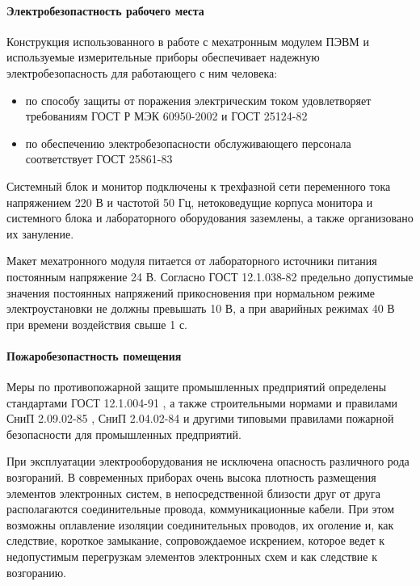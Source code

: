 \paragraph{Электробезопастность рабочего места}

Конструкция использованного в работе с мехатронным модулем ПЭВМ и используемые
измерительные приборы обеспечивает надежную электробезопасность для работающего
с ним человека:

\begin{itemize}
    \item   по способу защиты от поражения электрическим током удовлетворяет
            требованиям ГОСТ Р МЭК 60950-2002 \cite{ecology_gost_60950_2002}
            и ГОСТ 25124-82 \cite{ecology_gost_25124_82}

    \item   по обеспечению электробезопасности обслуживающего персонала
            соответствует ГОСТ 25861-83 \cite{ecology_gost_25861_83}
\end{itemize}

Системный блок и монитор подключены к трехфазной сети переменного тока напряжением
220 В и частотой 50 Гц, нетоковедущие корпуса монитора и системного блока и лабораторного
оборудования заземлены, а также организовано их зануление.

Макет мехатронного модуля питается от лабораторного источники питания постоянным
напряжение 24 В. Согласно ГОСТ 12.1.038-82 \cite{ecology_gost_038_82}
предельно допустимые значения постоянных напряжений прикосновения при нормальном
режиме электроустановки не должны превышать 10 В, а при аварийных режимах 40 В
при времени воздействия свыше 1 с.

\paragraph{Пожаробезопастность помещения}

Меры по противопожарной защите промышленных предприятий определены стандартами
ГОСТ 12.1.004-91 \cite{ecology_gost_004_91}, а также строительными нормами
и правилами СниП 2.09.02-85 \cite{ecology_snip_02_85}, СниП 2.04.02-84
\cite{ecology_snip_02_84} и другими типовыми правилами пожарной безопасности для
промышленных предприятий.

При эксплуатации электрооборудования не исключена опасность различного рода возгораний.
В современных приборах очень высока плотность размещения элементов электронных
систем, в непосредственной близости друг от друга располагаются соединительные
провода, коммуникационные кабели. При этом возможны оплавление изоляции соединительных
проводов, их оголение и, как следствие, короткое замыкание, сопровождаемое искрением,
которое ведет к недопустимым перегрузкам элементов электронных схем и как следствие
к возгоранию.

